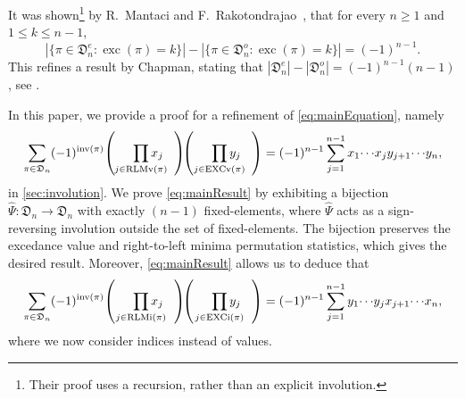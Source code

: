 \documentclass[reqno]{amsart}
\newtheorem{theorem}{Theorem}
\theoremstyle{definition}
\newcommand{\symS}{\mathfrak{S}}
\newcommand{\dArr}{\mathfrak{D}}
\newcommand{\frether}{\hat{\Psi}}
\DeclareMathOperator{\inv}{inv}
\DeclareMathOperator{\exc}{exc}
\DeclareMathOperator{\EXCi}{EXCi}
\DeclareMathOperator{\EXCv}{EXCv}
\DeclareMathOperator{\RLMv}{RLMv}
\DeclareMathOperator{\RLMi}{RLMi}
\begin{document}
\bigskip
It was shown\footnote{Their proof uses a recursion, rather than an explicit involution.}
by R.~Mantaci and F.~Rakotondrajao~\cite[Proposition 4.3]{MantaciRakotondrajao2003},
that for every $n\geq 1$ and $1 \leq k \leq n-1$,
\begin{equation}\label{eq:mainEquation}
 |\{ \pi \in \dArr^e_n  : \exc(\pi) = k \}|
 -
 |\{ \pi \in \dArr^o_n  : \exc(\pi)=k \}|
 =(-1)^{n-1}.
\end{equation}
This refines a result by Chapman, stating that
$|\dArr^e_n|-|\dArr^o_n|=(-1)^{n-1}(n-1)$, see \cite{Chapman2001}. 

\medskip
In this paper, we provide a proof for a refinement of \eqref{eq:mainEquation}, namely
\begin{equation}\label{eq:mainResult}
 \sum_{\pi \in \dArr_n} (-1)^{\inv(\pi)} \!
 \left( \hspace{5mm}
 \prod_{\mathclap{j\in \RLMv(\pi)}}  x_j 
 \hspace{3mm}
 \right)
 \!\!
 \left( \hspace{5mm}
 \prod_{\mathclap{j\in \EXCv(\pi)}}  y_{j}
 \hspace{3mm}
 \right)
 = 
 (-1)^{n-1} \sum_{j=1}^{n-1} x_1 \!\dotsm \! x_j y_{j+1}  \!\dotsm  \! y_{n},
\end{equation}
in \cref{sec:involution}.
%
We prove \eqref{eq:mainResult} by
exhibiting a bijection $\frether: \dArr_n \to \dArr_n$
with exactly $(n-1)$ fixed-elements, where $\frether$ acts as a sign-reversing involution outside the set of fixed-elements.
The bijection preserves
the excedance value and right-to-left minima permutation statistics,
which gives the desired result.
Moreover, \eqref{eq:mainResult} allows us to deduce that
\begin{equation*}\label{eq:mainResult2}
\sum_{\pi \in \dArr_n} (-1)^{\inv(\pi)} \!
 \left( \hspace{5mm}
 \prod_{\mathclap{j\in \RLMi(\pi)}}  x_j 
 \hspace{3mm}
 \right)
 \!\!
 \left( \hspace{5mm}
 \prod_{\mathclap{j\in \EXCi(\pi)}}  y_{j}
 \hspace{3mm}
 \right)
 = 
 (-1)^{n-1} \sum_{j=1}^{n-1} y_1 \!\dotsm \! y_j x_{j+1}  \!\dotsm  \! x_{n},
\end{equation*}
where we now consider indices instead of values.

\medskip 

\end{document}
